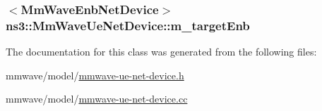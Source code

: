 \subsubsection[{\texorpdfstring{m\+\_\+target\+Enb}{m_targetEnb}}]{$<${\bf Mm\+Wave\+Enb\+Net\+Device}$>$ ns3\+::\+Mm\+Wave\+Ue\+Net\+Device\+::m\+\_\+target\+Enb\hspace{0.3cm}{\ttfamily [private]}}\hypertarget{classns3_1_1MmWaveUeNetDevice_a2c801f63c2a5e84e8c81253d6453e5c8}{}\label{classns3_1_1MmWaveUeNetDevice_a2c801f63c2a5e84e8c81253d6453e5c8}


The documentation for this class was generated from the following files\+:\begin{DoxyCompactItemize}
\item 
mmwave/model/\hyperlink{mmwave-ue-net-device_8h}{mmwave-\/ue-\/net-\/device.\+h}\item 
mmwave/model/\hyperlink{mmwave-ue-net-device_8cc}{mmwave-\/ue-\/net-\/device.\+cc}\end{DoxyCompactItemize}
